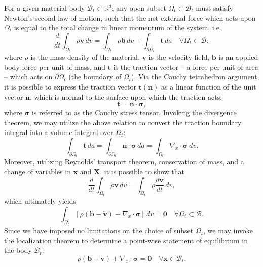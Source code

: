 For a given material body $\mathcal{B}_t \subset \mathbb{R}^d$, any open subset $\Omega_t \subset \mathcal{B}_t$ must satisfy Newton's second law of motion, such that the net external force which acts upon $\Omega_t$ is equal to the total change in linear momentum of the system, i.e.
\begin{equation}
  \frac{d}{dt} \int_{\Omega_t} \rho \mathbf{v} \, dv = \int_{\Omega_t} \rho \mathbf{b} \, dv + \int_{\partial \Omega_t} \mathbf{t} \, da \quad \forall \Omega_t \subset \mathcal{B},
\end{equation}
where $\rho$ is the mass density of the material, $\mathbf{v}$ is the velocity field, $\mathbf{b}$ is an applied body force per unit of mass, and $\mathbf{t}$ is the traction vector -- a force per unit of area -- which acts on $\partial \Omega_t$ (the boundary of $\Omega_t$). Via the Cauchy tetrahedron argument, it is possible to express the traction vector $\mathbf{t} (\mathbf{n})$ as a linear function of the unit vector $\mathbf{n}$, which is normal to the surface upon which the traction acts:
\begin{equation}
  \mathbf{t} = \mathbf{n} \cdot \boldsymbol{\sigma},
\end{equation}
where $\boldsymbol{\sigma}$ is referred to as the Cauchy stress tensor. Invoking the divergence theorem, we may utilize the above relation to convert the traction boundary integral into a volume integral over $\Omega_t$:
\begin{equation}
  \int_{\partial \Omega_t} \mathbf{t} \, da = \int_{\partial \Omega_t} \mathbf{n} \cdot \boldsymbol{\sigma} \, da = \int_{\Omega_t} \nabla_x \cdot \boldsymbol{\sigma} \, dv.
\end{equation}
Moreover, utilizing Reynolds' transport theorem, conservation of mass, and a change of variables in $\mathbf{x}$ and $\mathbf{X}$, it is possible to show that
\begin{equation}
  \frac{d}{dt} \int_{\Omega_t} \rho \mathbf{v} \, dv = \int_{\Omega_t} \rho \frac{d \mathbf{v}}{dt} \, dv,
\end{equation}
which ultimately yields
\begin{equation}
  \int_{\Omega_t} \left[ \rho (\mathbf{b} - \dot{\mathbf{v}}) + \nabla_x \cdot \boldsymbol{\sigma} \right] \, dv = \mathbf{0} \quad \forall \Omega_t \subset \mathcal{B}.
\end{equation}
Since we have imposed no limitations on the choice of subset $\Omega_t$, we may invoke the localization theorem to determine a point-wise statement of equilibrium in the body $\mathcal{B}_t$:
\begin{equation}
  \rho (\mathbf{b} - \dot{\mathbf{v}}) + \nabla_x \cdot \boldsymbol{\sigma} = \mathbf{0} \quad \forall \mathbf{x} \in \mathcal{B}_t.
\end{equation}

